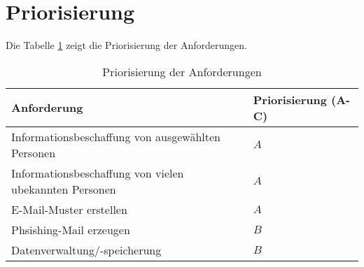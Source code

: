 \section{Priorisierung} %
\label{sec:} %
Die Tabelle \ref{tab:prio} zeigt die Priorisierung der Anforderungen.

\begin{table}
	\caption{Priorisierung der Anforderungen}
	\label{tab:prio}
	\begin{center} 
		\begin{tabular}{|l|l|}
			\hline
			Anforderung & Priorisierung (A-C) \\
			\hline
			Informationsbeschaffung von ausgewählten Personen & $ A $ \\
			\hline
			Informationsbeschaffung von vielen ubekannten Personen & $ A $ \\
			\hline
			E-Mail-Muster erstellen & $ A $    \\
			\hline
			Phsishing-Mail erzeugen & $ B $   \\
			\hline
			Datenverwaltung/-speicherung & $ B $   \\
			\hline
		\end{tabular}
	\end{center}
\end{table}